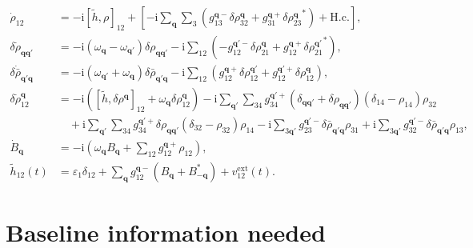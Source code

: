 \documentclass[
  reprint,
  amsmath,
  amssymb,
  aps,
  pra,
  nofootinbib,
  superscriptaddress,
  floatfix
]{revtex4-2}
\newcommand{\ii}{\mathrm{i}}
\begin{document}
\begin{widetext}
\begin{subequations}
\label{eq:paper_v_source_eom}
\begin{align}
\dot{\rho}_{12}
&=
-\ii[\tilde h,\rho]_{12}
+\left[
-\ii\sum_{\mathbf q}\sum_3
\left(
g_{13}^{\mathbf q-}\delta\rho_{32}^{\mathbf q}
+g_{31}^{\mathbf q+}{\delta\rho_{23}^{\mathbf q}}^{*}
\right)
+\mathrm{H.c.}
\right],
\label{eq:paper_v_rho_electron}
\\
\delta\dot{\rho}_{\mathbf q\mathbf q'}
&=
-\ii(\omega_{\mathbf q}-\omega_{\mathbf q'})
\delta\rho_{\mathbf q\mathbf q'}
-\ii\sum_{12}
\left(
-g_{12}^{\mathbf q'-}\delta\rho_{21}^{\mathbf q}
+g_{12}^{\mathbf q+}{\delta\rho_{21}^{\mathbf q'}}^{*}
\right),
\label{eq:paper_v_delta_rho}
\\
\delta\dot{\bar\rho}_{\mathbf q'\mathbf q}
&=
-\ii(\omega_{\mathbf q'}+\omega_{\mathbf q})
\delta\bar\rho_{\mathbf q'\mathbf q}
-\ii\sum_{12}
\left(
g_{12}^{\mathbf q+}\delta\rho_{12}^{\mathbf q'}
+g_{12}^{\mathbf q'+}\delta\rho_{12}^{\mathbf q}
\right),
\label{eq:paper_v_delta_rho_bar}
\\
\delta\dot{\rho}_{12}^{\mathbf q}
&=
-\ii\left(
[\tilde h,\delta\rho^{\mathbf q}]_{12}
+\omega_{\mathbf q}\delta\rho_{12}^{\mathbf q}
\right)
-\ii\sum_{\mathbf q'}\sum_{34}
g_{34}^{\mathbf q'+}
(\delta_{\mathbf q\mathbf q'}+\delta\rho_{\mathbf q\mathbf q'})
(\delta_{14}-\rho_{14})\rho_{32}
\nonumber\\
&\quad
+\ii\sum_{\mathbf q'}\sum_{34}
g_{34}^{\mathbf q'+}\delta\rho_{\mathbf q\mathbf q'}
(\delta_{32}-\rho_{32})\rho_{14}
-\ii\sum_{3\mathbf q'}
g_{23}^{\mathbf q'-}\delta\bar\rho_{\mathbf q'\mathbf q}\rho_{31}
+\ii\sum_{3\mathbf q'}
g_{32}^{\mathbf q'-}\delta\bar\rho_{\mathbf q'\mathbf q}\rho_{13},
\label{eq:paper_v_delta_rho12q}
\\
\dot B_{\mathbf q}
&=
-\ii\left(
\omega_{\mathbf q}B_{\mathbf q}
+\sum_{12}g_{12}^{\mathbf q+}\rho_{12}
\right),
\label{eq:paper_v_B}
\\
\tilde h_{12}(t)
&=
\varepsilon_1\delta_{12}
+\sum_{\mathbf q}g_{12}^{\mathbf q-}
\left(B_{\mathbf q}+B_{-\mathbf q}^{*}\right)
+v_{12}^{\mathrm{ext}}(t).
\label{eq:paper_v_htilde}
\end{align}
\end{subequations}
\end{widetext}

\section{Baseline information needed}
\label{sec:baseline_needed}
\end{document}
